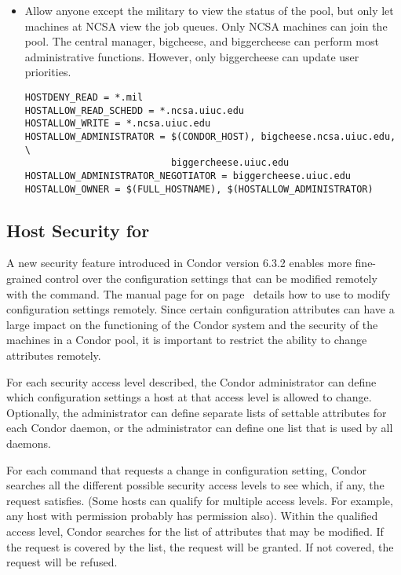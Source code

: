 \begin{itemize}
\item Allow anyone except the military to view the status of the
pool, but only let machines at NCSA view the job queues.
Only NCSA machines can join the pool.
The central manager, bigcheese, and
biggercheese can perform most administrative functions.
However, only biggercheese can update user priorities.
\begin{verbatim}
HOSTDENY_READ = *.mil
HOSTALLOW_READ_SCHEDD = *.ncsa.uiuc.edu 
HOSTALLOW_WRITE = *.ncsa.uiuc.edu
HOSTALLOW_ADMINISTRATOR = $(CONDOR_HOST), bigcheese.ncsa.uiuc.edu, \
                          biggercheese.uiuc.edu
HOSTALLOW_ADMINISTRATOR_NEGOTIATOR = biggercheese.uiuc.edu
HOSTALLOW_OWNER = $(FULL_HOSTNAME), $(HOSTALLOW_ADMINISTRATOR)
\end{verbatim}

\end{itemize}


\subsection{\label{sec:Config-Val-Security} Host Security for
}

A new security feature introduced in
Condor version 6.3.2 enables more fine-grained control over the
configuration settings that can be modified remotely with the
 command.
The manual page for  on
page~\pageref{man-condor-config-val} details how to use 
\Condor{config\_val} to modify configuration settings remotely. 
Since certain configuration attributes can have a large impact on the 
functioning of the Condor system and the security of the machines in a
Condor pool, it is important to restrict the ability to change
attributes remotely.

For each security access level described,
the Condor
administrator can define which configuration settings a host at that
access level is allowed to change.
Optionally, the administrator can define separate lists of settable
attributes for each Condor daemon, or the administrator
can define one list that is used by all daemons.

For each command that requests a change in configuration setting,
Condor searches all the different possible security access
levels to see which, if any, the request satisfies.
(Some hosts can qualify for multiple access levels. For example, any
host with \DCPerm{ADMINISTRATOR} permission probably has
 permission also).
Within the qualified access level,
Condor searches for the list of attributes that may be modified.
If the request is covered by the list,
the request will be granted.
If not covered, the request will be refused.

